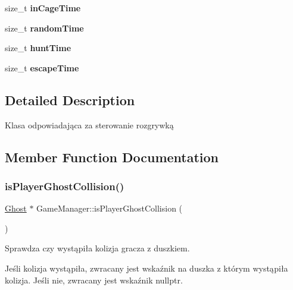 \begin{DoxyCompactItemize}
\mbox{\label{classGameManager_acc72348281472430c80ffd848684ce12}} 
size\+\_\+t {\bfseries in\+Cage\+Time}
\item 
\mbox{\label{classGameManager_abf0b652a4e156ec223972c7bf6c1eb15}} 
size\+\_\+t {\bfseries random\+Time}
\item 
\mbox{\label{classGameManager_a8130420b803aec3db667810ee68b1ef0}} 
size\+\_\+t {\bfseries hunt\+Time}
\item 
\mbox{\label{classGameManager_a64ed2adecf7732b25fd0dfe0105f8f22}} 
size\+\_\+t {\bfseries escape\+Time}
\end{DoxyCompactItemize}


\subsection{Detailed Description}
Klasa odpowiadająca za sterowanie rozgrywką 

\subsection{Member Function Documentation}
\mbox{\label{classGameManager_affd9b70b3b26c7e6cf09a5a503f87bbf}} 
\subsubsection{\texorpdfstring{is\+Player\+Ghost\+Collision()}{isPlayerGhostCollision()}}
{\footnotesize\ttfamily \hyperlink{classGhost}{Ghost} $\ast$ Game\+Manager\+::is\+Player\+Ghost\+Collision (\begin{DoxyParamCaption}{ }\end{DoxyParamCaption})}



Sprawdza czy wystąpiła kolizja gracza z duszkiem. 

Jeśli kolizja wystąpiła, zwracany jest wskaźnik na duszka z którym wystąpiła kolizja. Jeśli nie, zwracany jest wskaźnik nullptr. \mbox{\label{classGameManager_a68f66efe17738b9773ce193f032287eb}} 
